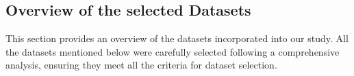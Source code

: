 \begin{itemize}


\end{itemize}
     
\subsection{Overview of the selected Datasets}
\label{sec:Solution Approach:Survey Open Datasets: Overview of the selected Datasets}
This section provides an overview of the datasets incorporated into our study. All the datasets mentioned below were carefully selected following a comprehensive analysis, ensuring they meet all the criteria for dataset selection.  

